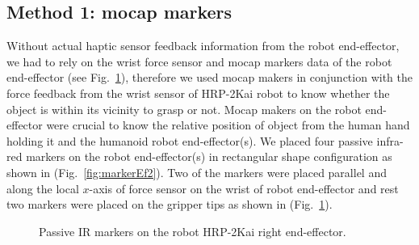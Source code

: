 \subsection{Method 1: mocap markers}
Without actual haptic sensor feedback information from the robot end-effector, we had to rely on the wrist force sensor and mocap markers data of the robot end-effector (see Fig.~\ref{fig:markerEf}), therefore we used mocap makers in conjunction with the force feedback from the wrist sensor of HRP-2Kai robot to know whether the object is within its vicinity to grasp or not. Mocap makers on the robot end-effector were crucial to know the relative position of object from the human hand holding it and the humanoid robot end-effector(s). We placed four passive infra-red markers on the robot end-effector(s) in rectangular shape configuration as shown in (Fig.~\ref{fig:markerEf2}). Two of the markers were placed parallel and along the local $x$-axis of force sensor on the wrist of robot end-effector and rest two markers were placed on the gripper tips as shown in (Fig.~\ref{fig:markerEf}).

\begin{figure}[ht]
	\caption{Passive IR markers on the robot HRP-2Kai right end-effector.}
	\label{fig:markerEf}
\end{figure} 


